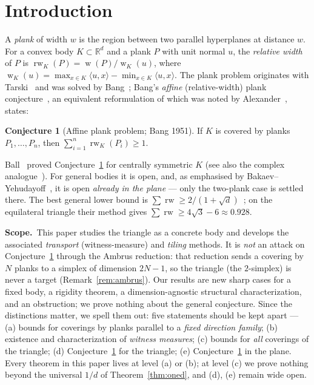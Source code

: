 \documentclass{aims}
\numberwithin{equation}{section}
\theoremstyle{plain}
\theoremstyle{definition}
\newtheorem{conjecture}[theorem]{Conjecture}
\theoremstyle{remark}
\newcommand{\rw}{\operatorname{rw}}
\newcommand{\R}{\mathbb{R}}
\DeclareMathOperator{\wid}{w}
\begin{document}

\maketitle

\section{Introduction}\label{sec:intro}

A \emph{plank} of width $w$ is the region between two parallel hyperplanes at
distance $w$. For a convex body $K\subset\R^d$ and a plank $P$ with unit normal $u$,
the \emph{relative width} of $P$ is $\rw_K(P)=\wid(P)/\wid_K(u)$, where
$\wid_K(u)=\max_{x\in K}\langle u,x\rangle-\min_{x\in K}\langle u,x\rangle$. The
plank problem originates with Tarski~\cite{Tarski32,Moese32} and was solved by
Bang~\cite{Bang51}; Bang's \emph{affine} (relative-width) plank
conjecture~\cite{Bang51,Ambrus}, an equivalent reformulation of which was noted
by Alexander~\cite{Alexander68}, states:
\begin{conjecture}[Affine plank problem; Bang 1951]\label{conj:bang}
If $K$ is covered by planks $P_1,\dots,P_n$, then $\sum_{i=1}^n \rw_K(P_i)\ge 1$.
\end{conjecture}
Ball~\cite{Ball91} proved Conjecture~\ref{conj:bang} for centrally symmetric $K$
(see also the complex analogue~\cite{Ball01}).
For general bodies it is open, and, as emphasised by Bakaev--Yehudayoff~\cite{BY26},
it is open \emph{already in the plane} --- only the two-plank case is settled there.
The best general lower bound is
$\sum\rw\ge 2/(1+\sqrt d)$~\cite{BY26}; on the equilateral triangle their method
gives $\sum\rw\ge 4\sqrt3-6\approx0.928$.

\smallskip
\noindent\textbf{Scope.}\ This paper studies the triangle as a concrete body and
develops the associated \emph{transport} (witness-measure) and \emph{tiling}
methods. It is \emph{not} an attack on Conjecture~\ref{conj:bang} through the Ambrus
reduction: that reduction sends a covering by $N$ planks to a simplex of dimension
$2N-1$, so the triangle (the $2$-simplex) is never a target
(Remark~\ref{rem:ambrus}). Our results are new sharp cases for a fixed body, a
rigidity theorem, a dimension-agnostic structural characterization, and an
obstruction; we prove nothing about the general conjecture. Since the
distinctions matter, we spell them out: five statements should be kept apart ---
(a) bounds for coverings by planks parallel to a \emph{fixed direction family};
(b) existence and characterization of \emph{witness measures}; (c) bounds for
\emph{all} coverings of the triangle; (d) Conjecture~\ref{conj:bang} for the
triangle; (e) Conjecture~\ref{conj:bang} in the plane. Every theorem in this
paper lives at level (a) or (b); at level (c) we prove nothing beyond the
universal $1/d$ of Theorem~\ref{thm:oned}, and (d), (e) remain wide open.
\end{document}

